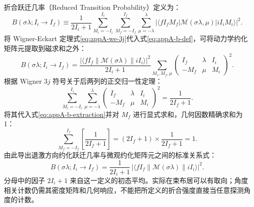 折合跃迁几率（Reduced Transition Probability）定义为：
\begin{equation}\label{eq:appA-b-def}
B(\sigma\lambda; I_i \to I_f) \equiv \frac{1}{2I_i + 1} \sum_{M_i=-I_i}^{I_i} \sum_{M_f=-I_f}^{I_f} \sum_{\mu=-\lambda}^\lambda |\langle f I_f M_f | \mathcal{M}(\sigma\lambda, \mu) | i I_i M_i \rangle|^2 .
\end{equation}
将 Wigner-Eckart 定理式\eqref{eq:appA-we-3j}代入式\eqref{eq:appA-b-def}，可将动力学约化矩阵元提取到磁求和之外：
\begin{equation}\label{eq:appA-b-extraction}
B(\sigma\lambda; I_i \to I_f) = \frac{|\langle f I_f \| \mathcal{M}(\sigma\lambda) \| i I_i \rangle|^2}{2I_i + 1} \sum_{M_i, M_f, \mu} \begin{pmatrix} I_f & \lambda & I_i \\ -M_f & \mu & M_i \end{pmatrix}^2 .
\end{equation}
根据 Wigner $3j$ 符号关于后两列的正交归一性定理：
\begin{equation}\label{eq:appA-3j-ortho-sum}
\sum_{M_i=-I_i}^{I_i} \sum_{\mu=-\lambda}^\lambda \begin{pmatrix} I_f & \lambda & I_i \\ -M_f & \mu & M_i \end{pmatrix}^2 = \frac{1}{2I_f + 1} .
\end{equation}
将其代入式\eqref{eq:appA-b-extraction}并对 $M_f$ 进行显式求和，几何因数精确求和为 1：
\begin{equation}\label{eq:appA-b-sum-unity}
\sum_{M_f=-I_f}^{I_f} \left[ \frac{1}{2I_f + 1} \right] = (2I_f + 1) \times \frac{1}{2I_f + 1} = 1 .
\end{equation}
由此导出退激方向约化跃迁几率与微观约化矩阵元之间的标准关系式：
\begin{equation}\label{eq:appA-b-standard-down}
B(\sigma\lambda; I_i \to I_f) = \frac{1}{2I_i + 1} \, |\langle f I_f \| \mathcal{M}(\sigma\lambda) \| i I_i \rangle|^2 .
\end{equation}
分母中的因子 $2I_i+1$ 来自这一定义的初态平均。实际在束布居可以有取向；角度相关计数仍需其密度矩阵和几何响应，不能把所定义的折合强度直接当任意探测角度的计数。

